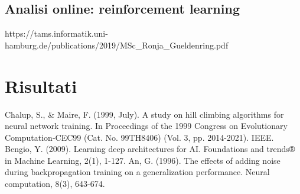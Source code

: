 \documentclass[a4paper,12pt]{report}
\begin{document}
\section{Analisi online: reinforcement learning}
https://tams.informatik.uni-hamburg.de/publications/2019/MSc\_Ronja\_Gueldenring.pdf

\newpage
\chapter{Risultati}
\label{cap5}

\newpage
\cite{es}

%
%
\begin{thebibliography}{9}
	Chalup, S., \& Maire, F. (1999, July). A study on hill climbing algorithms for neural network training. In Proceedings of the 1999 Congress on Evolutionary Computation-CEC99 (Cat. No. 99TH8406) (Vol. 3, pp. 2014-2021). IEEE.
	\bibitem{}
	Bengio, Y. (2009). Learning deep architectures for AI. Foundations and trends® in Machine Learning, 2(1), 1-127.
	\bibitem{}
	An, G. (1996). The effects of adding noise during backpropagation training on a generalization performance. Neural computation, 8(3), 643-674.
\end{thebibliography}
\end{document}
